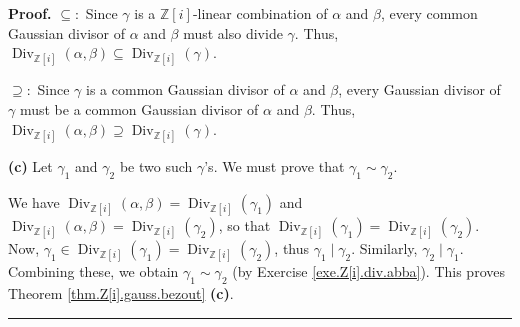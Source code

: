 \documentclass[numbers=enddot,12pt,final,onecolumn,notitlepage]{scrartcl}%
\numberwithin{exer}{subsection}
\theoremstyle{definition}
\newenvironment{proof}[1][Proof]{\noindent\textbf{#1.} }{\ \rule{0.5em}{0.5em}}
\begin{document}
\begin{proof}
$\subseteq:$ Since $\gamma$ is a $\mathbb{Z}\left[  i\right]  $-linear
combination of $\alpha$ and $\beta$, every common Gaussian divisor of $\alpha$
and $\beta$ must also divide $\gamma$. Thus, $\operatorname*{Div}%
\nolimits_{\mathbb{Z}\left[  i\right]  }\left(  \alpha,\beta\right)
\subseteq\operatorname*{Div}\nolimits_{\mathbb{Z}\left[  i\right]  }\left(
\gamma\right)  $.

$\supseteq:$ Since $\gamma$ is a common Gaussian divisor of $\alpha$ and
$\beta$, every Gaussian divisor of $\gamma$ must be a common Gaussian divisor
of $\alpha$ and $\beta$. Thus, $\operatorname*{Div}\nolimits_{\mathbb{Z}%
\left[  i\right]  }\left(  \alpha,\beta\right)  \supseteq\operatorname*{Div}%
\nolimits_{\mathbb{Z}\left[  i\right]  }\left(  \gamma\right)  $.

\textbf{(c)} Let $\gamma_{1}$ and $\gamma_{2}$ be two such $\gamma$'s. We must
prove that $\gamma_{1}\sim\gamma_{2}$.

We have $\operatorname*{Div}\nolimits_{\mathbb{Z}\left[  i\right]  }\left(
\alpha,\beta\right)  =\operatorname*{Div}\nolimits_{\mathbb{Z}\left[
i\right]  }\left(  \gamma_{1}\right)  $ and $\operatorname*{Div}%
\nolimits_{\mathbb{Z}\left[  i\right]  }\left(  \alpha,\beta\right)
=\operatorname*{Div}\nolimits_{\mathbb{Z}\left[  i\right]  }\left(  \gamma
_{2}\right)  $, so that $\operatorname*{Div}\nolimits_{\mathbb{Z}\left[
i\right]  }\left(  \gamma_{1}\right)  =\operatorname*{Div}%
\nolimits_{\mathbb{Z}\left[  i\right]  }\left(  \gamma_{2}\right)  $. Now,
$\gamma_{1}\in\operatorname*{Div}\nolimits_{\mathbb{Z}\left[  i\right]
}\left(  \gamma_{1}\right)  =\operatorname*{Div}\nolimits_{\mathbb{Z}\left[
i\right]  }\left(  \gamma_{2}\right)  $, thus $\gamma_{1}\mid\gamma_{2}$.
Similarly, $\gamma_{2}\mid\gamma_{1}$. Combining these, we obtain $\gamma
_{1}\sim\gamma_{2}$ (by Exercise \ref{exe.Z[i].div.abba}). This proves Theorem
\ref{thm.Z[i].gauss.bezout} \textbf{(c)}.
\end{proof}
\end{document}
